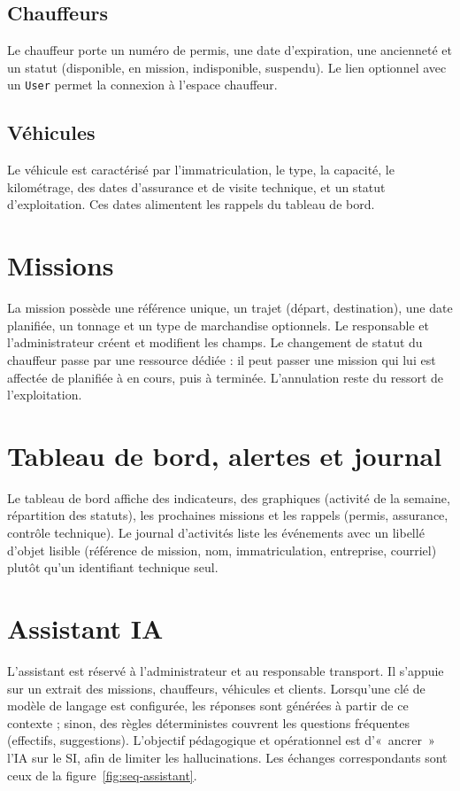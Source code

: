 \subsection{Chauffeurs}

Le chauffeur porte un numéro de permis, une date d'expiration, une ancienneté et un statut (disponible, en mission, indisponible, suspendu). Le lien optionnel avec un \texttt{User} permet la connexion à l'espace chauffeur.

\subsection{Véhicules}

Le véhicule est caractérisé par l'immatriculation, le type, la capacité, le kilométrage, des dates d'assurance et de visite technique, et un statut d'exploitation. Ces dates alimentent les rappels du tableau de bord.

\section{Missions}

La mission possède une référence unique, un trajet (départ, destination), une date planifiée, un tonnage et un type de marchandise optionnels. Le responsable et l'administrateur créent et modifient les champs. Le changement de statut du chauffeur passe par une ressource dédiée : il peut passer une mission qui lui est affectée de planifiée à en cours, puis à terminée. L'annulation reste du ressort de l'exploitation.

\section{Tableau de bord, alertes et journal}

Le tableau de bord affiche des indicateurs, des graphiques (activité de la semaine, répartition des statuts), les prochaines missions et les rappels (permis, assurance, contrôle technique). Le journal d'activités liste les événements avec un libellé d'objet lisible (référence de mission, nom, immatriculation, entreprise, courriel) plutôt qu'un identifiant technique seul.

\section{Assistant IA}

L'assistant est réservé à l'administrateur et au responsable transport. Il s'appuie sur un extrait des missions, chauffeurs, véhicules et clients. Lorsqu'une clé de modèle de langage est configurée, les réponses sont générées à partir de ce contexte ; sinon, des règles déterministes couvrent les questions fréquentes (effectifs, suggestions). L'objectif pédagogique et opérationnel est d'«~ancrer~» l'IA sur le SI, afin de limiter les hallucinations. Les échanges correspondants sont ceux de la figure~\ref{fig:seq-assistant}.

